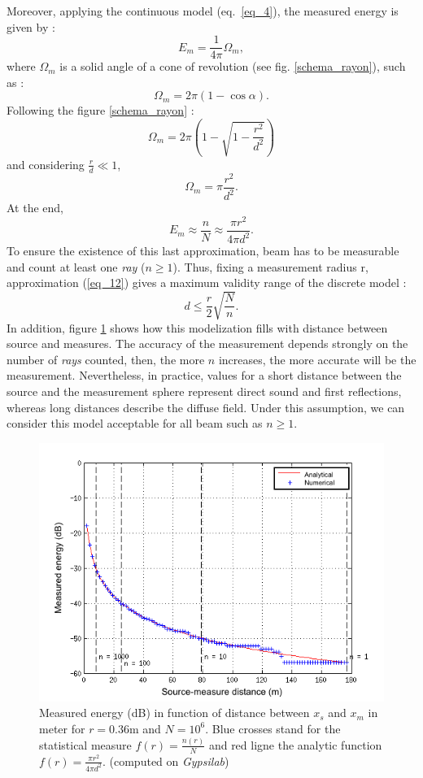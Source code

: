 \documentclass[AMA,STIX1COL]{WileyNJD-v2}
\begin{document}
Moreover, applying the continuous model (eq.~\ref{eq_4}), the measured energy is given by :
\begin{equation}
E_m = \frac{1}{4\pi}  \Omega_m,
\end{equation}
where $\Omega_m$ is a solid angle of a cone of revolution (see fig. \ref{schema_rayon}), such as :
\begin{equation}
\Omega_m = 2\pi(1-\cos{\alpha}).
\end{equation}
Following the figure \ref{schema_rayon} :
\begin{equation}
\Omega_m = 2\pi \left( 1 - \sqrt{1-\frac{r^2}{d^2}} \right)
\end{equation}
and considering $\frac{r}{d} \ll 1$, 
\begin{equation}
\Omega_m = \pi \frac{r^2}{d^2}.
\end{equation}
At the end, 
\begin{equation}
E_m \approx  \frac{n}{N} \approx  \frac{\pi r^2}{4\pi d^2}.
\label{eq_12}
\end{equation}
To ensure the existence of this last approximation, beam has to be measurable and count at least one \textit{ray} ($n\geq1$). Thus, fixing a measurement radius r, approximation (\ref{eq_12}) gives a maximum validity range of the discrete model :  
\begin{equation}
\label{eq_13}
	d \leq \frac{r}{2}\sqrt{\frac{N}{n}}.
\end{equation}
In addition, figure \ref{energie} shows how this modelization fills with distance between source and measures. The accuracy of the measurement depends strongly on the number of  \textit{rays} counted, then, the more $n$ increases, the more accurate will be the measurement. Nevertheless, in practice, values for a short distance between the source and the measurement sphere represent direct sound and first reflections, whereas long distances describe the diffuse field. Under this assumption, we can consider this model acceptable for all beam such as $n\geq1$. 

\begin{figure}[t]
\centering
	\includegraphics[width=0.65\linewidth]{energie.png}
	\caption{Measured energy (dB) in function of distance between $x_s$ and $x_m$ in meter for $r = 0.36$m and $N = 10^6$. Blue crosses stand for the statistical measure $f(r) = \frac{n(r)}{N}$ and red ligne the analytic function $f(r) = \frac{\pi r^2}{4\pi d^2}$. (computed on \textit{Gypsilab})}
	\label{energie}
\end{figure}
\end{document}
